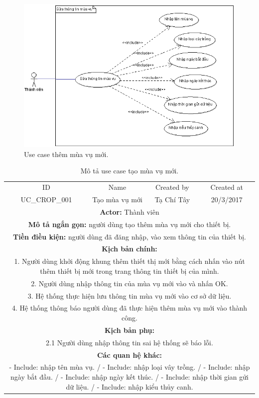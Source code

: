 \documentclass[a4paper,12pt,oneside]{article}
\begin{document}
\begin{figure}[htp]
\centering
\includegraphics[scale=.7]{hinh/sttmv.png}
\caption{Use case thêm mùa vụ mới.}
\end{figure}

\begin{table}[!htp]
\centering
\begin{tabularx}{\linewidth}{ |c||c|c|c| }
\hline
ID & Name & Created by & Created at\\
UC\_CROP\_001 & Tạo mùa vụ mới & Tạ Chí Tây & 20/3/2017\\
\hline
\multicolumn{4}{|X|}{\textbf{Actor:} Thành viên }\\
\hline
\multicolumn{4}{|X|}{\textbf{Mô tả ngắn gọn:} người dùng tạo thêm mùa vụ mới cho thiết bị. }\\
\hline
\multicolumn{4}{|X|}{\textbf{Tiền điều kiện:} người dùng đã đăng nhập, vào xem thông tin của thiết bị.}\\
\hline
\multicolumn{4}{|X|}{\textbf{Kịch bản chính:}}\\
\multicolumn{4}{|X|}{1. Người dùng khởi động khung thêm thiết thị mới bằng cách nhấn vào nút thêm thiết bị mới trong trang thông tin thiết bị của mình.}\\
\multicolumn{4}{|X|}{
2.	Người dùng nhập thông tin của mùa vụ mới vào và nhấn OK.}\\
\multicolumn{4}{|X|}{
3.	Hệ thống thực hiện lưu thông tin mùa vụ mới vào cơ sở dữ liệu.}\\
\multicolumn{4}{|X|}{
4. Hệ thống thông báo người dùng đã thực hiện thêm mùa vụ mới vào thành công.}\\
\hline
\multicolumn{4}{|X|}{\textbf{Kịch bản phụ:}}\\
\multicolumn{4}{|X|}{
2.1    Người dùng nhập thông tin sai hệ thống sẽ báo lỗi.}\\
\hline
\multicolumn{4}{|X|}{\textbf{Các quan hệ khác:}}\\
\multicolumn{4}{|X|}{- Include: nhập tên mùa vụ. / - Include: nhập loại vây trồng. / - Include: nhập ngày bắt đầu. / - Include: nhập ngày kết thúc. / - Include: nhập thời gian gửi dữ liệu. / - Include: nhập kiểu thủy canh.}\\
\hline

\end{tabularx}
\caption{Mô tả use case tạo mùa vụ mới.}
\end{table}
\end{document}
